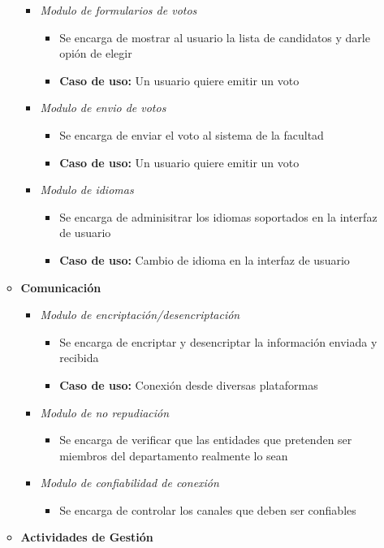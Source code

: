\begin{itemize}
\begin{itemize}
\begin{itemize}
 \item \emph{Modulo de formularios de votos}
\begin{itemize}
 \item Se encarga de mostrar al usuario la lista de candidatos y darle opión de elegir
 \item {\bf Caso de uso:} Un usuario quiere emitir un voto
\end{itemize}
 \item \emph{Modulo de envio de votos}
\begin{itemize}
 \item Se encarga de enviar el voto al sistema de la facultad
 \item {\bf Caso de uso:} Un usuario quiere emitir un voto
\end{itemize}
 \item \emph{Modulo de idiomas}
\begin{itemize}
 \item Se encarga de adminisitrar los idiomas soportados en la interfaz de usuario
 \item {\bf Caso de uso:} Cambio de idioma en la interfaz de usuario
\end{itemize}
\end{itemize}
 \item {\bf Comunicación}
\begin{itemize}
 \item \emph{Modulo de encriptación/desencriptación}
\begin{itemize}
 \item Se encarga de encriptar y desencriptar la información enviada y recibida
 \item {\bf Caso de uso:} Conexión desde diversas plataformas
\end{itemize}
 \item \emph{Modulo de no repudiación}
\begin{itemize}
 \item Se encarga de verificar que las entidades que pretenden ser miembros del departamento realmente lo sean
\end{itemize}
 \item \emph{Modulo de confiabilidad de conexión}
\begin{itemize}
 \item Se encarga de controlar los canales que deben ser confiables
\end{itemize}
\end{itemize}
 \item {\bf Actividades de Gestión}

\end{itemize}
\end{itemize}
